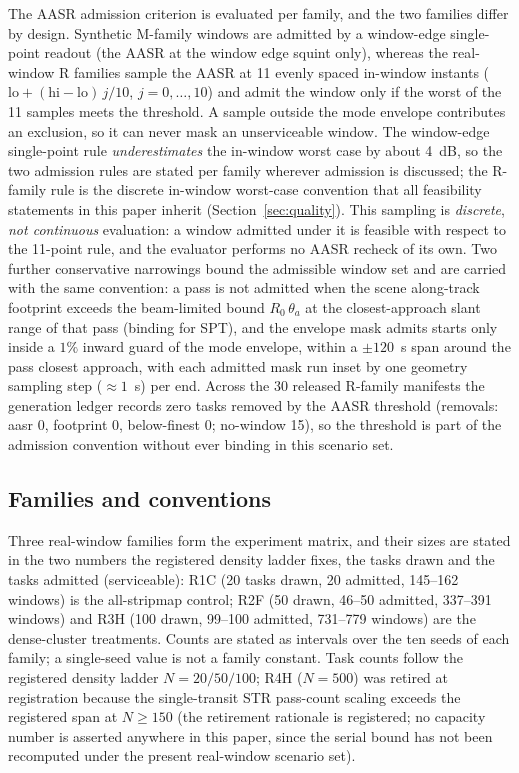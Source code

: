 \documentclass[preprint,authoryear]{elsarticle}
\begin{document}
The AASR admission criterion is evaluated per family, and the two families differ by design. Synthetic M-family windows are admitted by a window-edge single-point readout (the AASR at the window edge squint only), whereas the real-window R families sample the AASR at 11 evenly spaced in-window instants ($\mathrm{lo}+(\mathrm{hi}-\mathrm{lo})\,j/10$, $j=0,\dots,10$) and admit the window only if the worst of the 11 samples meets the threshold. A sample outside the mode envelope contributes an exclusion, so it can never mask an unserviceable window. The window-edge single-point rule \emph{underestimates} the in-window worst case by about 4~dB, so the two admission rules are stated per family wherever admission is discussed; the R-family rule is the discrete in-window worst-case convention that all feasibility statements in this paper inherit (Section~\ref{sec:quality}). This sampling is \emph{discrete}, \emph{not continuous} evaluation: a window admitted under it is feasible with respect to the 11-point rule, and the evaluator performs no AASR recheck of its own. Two further conservative narrowings bound the admissible window set and are carried with the same convention: a pass is not admitted when the scene along-track footprint exceeds the beam-limited bound $R_0\,\theta_a$ at the closest-approach slant range of that pass (binding for SPT), and the envelope mask admits starts only inside a $1\%$ inward guard of the mode envelope, within a $\pm120$~s span around the pass closest approach, with each admitted mask run inset by one geometry sampling step (${\approx}1$~s) per end. Across the 30 released R-family manifests the generation ledger records zero tasks removed by the AASR threshold (removals: aasr 0, footprint 0, below-finest 0; no-window 15), so the threshold is part of the admission convention without ever binding in this scenario set.

\subsection{Families and conventions}\label{sec:families}

Three real-window families form the experiment matrix, and their sizes are stated in the two numbers the registered density ladder fixes, the tasks drawn and the tasks admitted (serviceable): R1C (20 tasks drawn, 20 admitted, 145--162 windows) is the all-stripmap control; R2F (50 drawn, 46--50 admitted, 337--391 windows) and R3H (100 drawn, 99--100 admitted, 731--779 windows) are the dense-cluster treatments. Counts are stated as intervals over the ten seeds of each family; a single-seed value is not a family constant. Task counts follow the registered density ladder $N=20/50/100$; R4H ($N=500$) was retired at registration because the single-transit STR pass-count scaling exceeds the registered span at $N\ge 150$ (the retirement rationale is registered; no capacity number is asserted anywhere in this paper, since the serial bound has not been recomputed under the present real-window scenario set).
\end{document}
